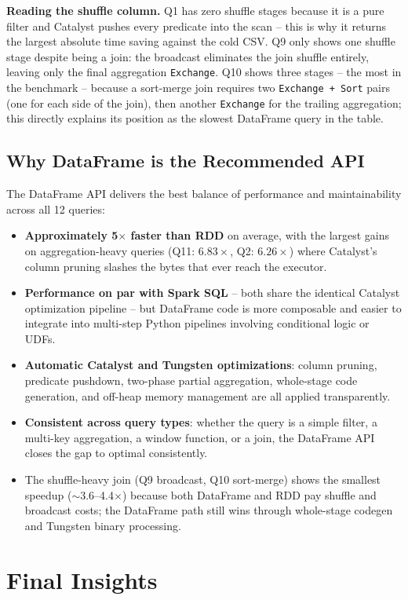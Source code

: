 \documentclass{article}
\begin{document}
\noindent\textbf{Reading the shuffle column.} Q1 has zero shuffle stages because it is a pure filter and Catalyst pushes every predicate into the scan -- this is why it returns the largest absolute time saving against the cold CSV. Q9 only shows one shuffle stage despite being a join: the broadcast eliminates the join shuffle entirely, leaving only the final aggregation \texttt{Exchange}. Q10 shows three stages -- the most in the benchmark -- because a sort-merge join requires two \texttt{Exchange + Sort} pairs (one for each side of the join), then another \texttt{Exchange} for the trailing aggregation; this directly explains its position as the slowest DataFrame query in the table.

\subsection*{Why DataFrame is the Recommended API}
The DataFrame API delivers the best balance of performance and maintainability across all 12 queries:
\begin{itemize}
    \item \textbf{Approximately 5$\times$ faster than RDD} on average, with the largest gains on aggregation-heavy queries (Q11: $6.83\times$, Q2: $6.26\times$) where Catalyst's column pruning slashes the bytes that ever reach the executor.
    \item \textbf{Performance on par with Spark SQL} -- both share the identical Catalyst optimization pipeline -- but DataFrame code is more composable and easier to integrate into multi-step Python pipelines involving conditional logic or UDFs.
    \item \textbf{Automatic Catalyst and Tungsten optimizations}: column pruning, predicate pushdown, two-phase partial aggregation, whole-stage code generation, and off-heap memory management are all applied transparently.
    \item \textbf{Consistent across query types}: whether the query is a simple filter, a multi-key aggregation, a window function, or a join, the DataFrame API closes the gap to optimal consistently.
    \item The shuffle-heavy join (Q9 broadcast, Q10 sort-merge) shows the smallest speedup ($\sim$3.6--4.4$\times$) because both DataFrame and RDD pay shuffle and broadcast costs; the DataFrame path still wins through whole-stage codegen and Tungsten binary processing.
\end{itemize}

\section{Final Insights}
\end{document}
